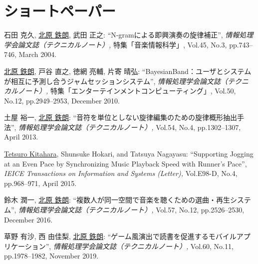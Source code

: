 \section*{ショートペーパー}
\begin{Enumerate}
  
\item 
石田 克久, 
\underline{北原 鉄朗}, 
武田 正之: 
    ``N-gramによる即興演奏の旋律補正'', 
    {\it 情報処理学会論文誌（テクニカルノート）,
    } 特集「音楽情報科学」, Vol.45, No.3, pp.743--746, March 2004. 

\item 
\underline{北原 鉄朗}, 
戸谷 直之, 
徳網 亮輔, 
片寄 晴弘: 
    ``BayesianBand：ユーザとシステムが相互に予測し合うジャムセッションシステム'', 
    {\it 情報処理学会論文誌（テクニカルノート）,
    } 特集「エンターテインメントコンピューティング」, Vol.50, No.12, pp.2949--2953, December 2010. 

\item 
土屋 裕一, 
\underline{北原 鉄朗}: 
    ``音符を単位としない旋律編集のための旋律概形抽出手法'', 
    {\it 情報処理学会論文誌（テクニカルノート）,
    } Vol.54, No.4, pp.1302--1307, April 2013. 

\item 
\underline{Tetsuro Kitahara}, 
Shunsuke Hokari, 
and 
Tatsuya Nagayasu: 
    ``Supporting Jogging at an Even Pace by Synchronizing Music
Playback Speed with Runner's Pace'', 
    {\it IEICE Transactions on Information and Systems (Letter),
    } Vol.E98-D, No.4, pp.968--971, April 2015. 

\item 
鈴木 潤一, 
\underline{北原 鉄朗}: 
    ``複数人が同一空間で音楽を聴くための選曲・再生システム'', 
    {\it 情報処理学会論文誌（テクニカルノート）,
    } Vol.57, No.12, pp.2526--2530, December 2016. 

\item 
草野 有沙, 
西 由佳梨, 
\underline{北原 鉄朗}: 
    ``ゲーム風演出で読書を促進するモバイルアプリケーション'', 
    {\it 情報処理学会論文誌（テクニカルノート）,
    } Vol.60, No.11, pp.1978--1982, November 2019. 

\end{Enumerate}

